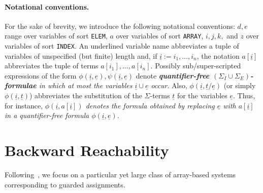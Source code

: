 \documentclass{LMCS}
\newcommand{\ue}{\ensuremath{\underline e}}
\newcommand{\ui}{\ensuremath{\underline i}}
\newcommand{\ut}{\ensuremath{\underline t}}
\theoremstyle{plain}\newtheorem{assumption}[thm]{Assumption}
\theoremstyle{plain}\newtheorem{proposition}[thm]{Proposition}
\theoremstyle{plain}\newtheorem{property}[thm]{Property}
\theoremstyle{plain}\newtheorem{example}[thm]{Example}
\theoremstyle{plain}\newtheorem{claim}[thm]{Claim}
\theoremstyle{plain}\newtheorem{lemma}[thm]{Lemma}
\begin{document}
\paragraph{ {\bf Notational conventions.}}  For
the sake of brevity, we
introduce the following notational conventions: $d,e$ range over
variables of sort {\tt ELEM}, $a$ over variables of sort {\tt ARRAY},
$i,j,k,$ and $z$ over variables of sort {\tt INDEX}.  An underlined
variable name abbreviates a tuple of variables of unspecified (but
finite) length and, if $\ui:=i_1, \dots, i_n$, the notation $a[\ui]$
abbreviates the tuple of terms $a[i_1], \dots, a[i_n]$.  Possibly
sub/super-scripted expressions of the form
$\phi(\ui,\ue),\psi(\ui,\ue)$ denote \emph{\textbf{ quantifier-free $(\Sigma_I
  \cup \Sigma_E)$-formulae} in which at most the variables $\ui\cup\ue$
  occur}.
Also, $\phi(\ui, \ut/\ue)$ (or simply $\phi(\ui, \ut)$)
abbreviates the substitution of the $\Sigma$-terms $\ut$ for the variables
$\ue$.
Thus, for
instance, \emph{$\phi(\ui, a[\ui])$ denotes the formula obtained by
replacing $\ue$ with $a[\ui]$ in a quantifier-free formula
$\phi(\ui, \ue)$}.



\section{Backward Reachability}
\label{sec:array}
Following~\cite{avocs08}, we focus on a particular yet large class of
array-based systems corresponding to guarded assignments.
\end{document}

